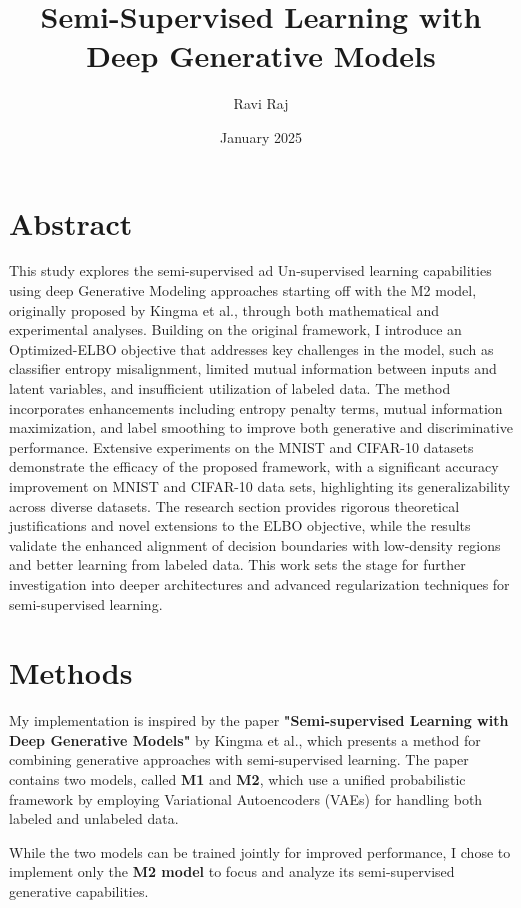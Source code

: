 \documentclass{article}
\title{Semi-Supervised Learning with Deep Generative Models}
\author{Ravi Raj}
\date{January 2025}
\begin{document}
\maketitle

\section*{Abstract}

This study explores the semi-supervised ad Un-supervised learning capabilities using deep Generative Modeling approaches starting off with the M2 model, originally proposed by Kingma et al., through both mathematical and experimental analyses. Building on the original framework, I introduce an Optimized-ELBO objective that addresses key challenges in the model, such as classifier entropy misalignment, limited mutual information between inputs and latent variables, and insufficient utilization of labeled data. The method incorporates enhancements including entropy penalty terms, mutual information maximization, and label smoothing to improve both generative and discriminative performance. Extensive experiments on the MNIST and CIFAR-10 datasets demonstrate the efficacy of the proposed framework, with a significant accuracy improvement on MNIST and CIFAR-10 data sets, highlighting its generalizability across diverse datasets. The research section provides rigorous theoretical justifications and novel extensions to the ELBO objective, while the results validate the enhanced alignment of decision boundaries with low-density regions and better learning from labeled data. This work sets the stage for further investigation into deeper architectures and advanced regularization techniques for semi-supervised learning.


\section*{Methods}

My implementation is inspired by the paper \textbf{"Semi-supervised Learning with Deep Generative Models"} by Kingma et al., which presents a method for combining generative approaches with semi-supervised learning. The paper contains two models, called \textbf{M1} and \textbf{M2}, which use a unified probabilistic framework by employing Variational Autoencoders (VAEs) for handling both labeled and unlabeled data.

While the two models can be trained jointly for improved performance, I chose to implement only the \textbf{M2 model} to focus and analyze its semi-supervised generative capabilities.
\end{document}
